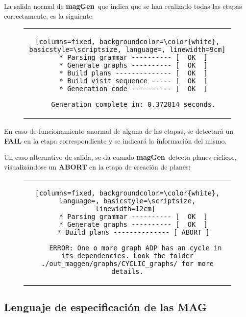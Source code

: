 \documentclass[runningheads,a4paper]{llncs}
\newcommand{\maggen}{\textbf{magGen}}
\begin{document}
La salida normal de \maggen\ que indica que se han realizado todas las etapas correctamente, es la siguiente:

\vspace{-0.5cm}
\begin{figure}[h]
\begin{center}
\begin{tabular}{c}
\begin{lstlisting}[columns=fixed, backgroundcolor=\color{white}, basicstyle=\scriptsize, language=, linewidth=9cm]
   * Parsing grammar ---------- [  OK  ]
   * Generate graphs ---------- [  OK  ]
   * Build plans -------------- [  OK  ]
   * Build visit sequence ----- [  OK  ]
   * Generation code ---------- [  OK  ]

   Generation complete in: 0.372814 seconds.
\end{lstlisting}
\end{tabular}
\end{center}
\end{figure}
\vspace{-0.9cm}

En caso de funcionamiento anormal de alguna de las etapas, se detectará un \textbf{FAIL} en la etapa correspondiente y se indicará la información del mismo.

Un caso alternativo de salida, se da cuando \maggen\ detecta planes cíclicos, visualizándose un \textbf{ABORT} en la etapa de creación de planes:

\vspace{-0.5cm}
\begin{figure}[h]
\begin{center}
\begin{tabular}{c}
\begin{lstlisting}[columns=fixed, backgroundcolor=\color{white}, language=, basicstyle=\scriptsize, linewidth=12cm] 
   * Parsing grammar ---------- [  OK  ]
   * Generate graphs ---------- [  OK  ]
   * Build plans -------------- [ ABORT ]

    ERROR: One o more graph ADP has an cycle in its dependencies. Look the folder ./out_maggen/graphs/CYCLIC_graphs/ for more details.
\end{lstlisting}
\end{tabular}
\end{center}
\end{figure}
\vspace{-0.9cm}

\subsection{Lenguaje de especificación de las MAG}
\label{sec:lenguajeMAG}
\end{document}
